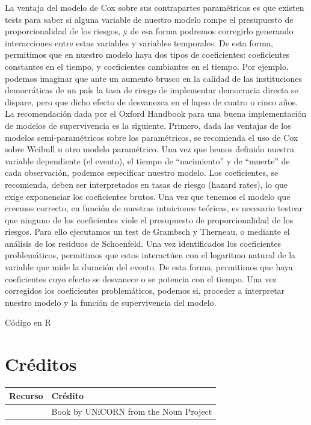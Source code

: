 \documentclass[]{book}
\begin{document}
La ventaja del modelo de Cox sobre sus contrapartes paramétricas es que
existen tests para saber si alguna variable de nuestro modelo rompe el
presupuesto de proporcionalidad de los riesgos, y de esa forma podremos
corregirlo generando interacciones entre estas variables y variables
temporales. De esta forma, permitimos que en nuestro modelo haya dos
tipos de coeficientes: coeficientes constantes en el tiempo, y
coeficientes cambiantes en el tiempo. Por ejemplo, podemos imaginar que
ante un aumento brusco en la calidad de las instituciones democráticas
de un país la tasa de riesgo de implementar democracia directa se
dispare, pero que dicho efecto de desvanezca en el lapso de cuatro o
cinco años. La recomendación dada por el Oxford Handbook para una buena
implementación de modelos de supervivencia es la siguiente. Primero,
dada las ventajas de los modelos semi-paramétricos sobre los
paramétricos, se recomienda el uso de Cox sobre Weibull u otro modelo
paramétrico. Una vez que hemos definido nuestra variable dependiente (el
evento), el tiempo de ``nacimiento'' y de ``muerte'' de cada
observación, podemos especificar nuestro modelo. Los coeficientes, se
recomienda, deben ser interpretados en tasas de riesgo (hazard rates),
lo que exige exponenciar los coeficientes brutos. Una vez que tenemos el
modelo que creemos correcto, en función de nuestras intuiciones
teóricas, es necesario testear que ninguno de los coeficientes viole el
presupuesto de proporcionalidad de los riesgos. Para ello ejecutamos un
test de Grambsch y Therneau, o mediante el análisis de los residuos de
Schoenfeld. Una vez identificados los coeficientes problemáticos,
permitimos que estos interactúen con el logaritmo natural de la variable
que mide la duración del evento. De esta forma, permitimos que haya
coeficientes cuyo efecto se desvanece o se potencia con el tiempo. Una
vez corregidos los coeficientes problemáticos, podemos si, proceder a
interpretar nuestro modelo y la función de supervivencia del modelo.

Código en R

\chapter*{Créditos}\label{creditos}

\begin{longtable}[]{@{}cl@{}}
\toprule
Recurso & Crédito\tabularnewline
\midrule
\endhead
& Book by UNiCORN from the Noun Project\tabularnewline
\bottomrule
\end{longtable}


\end{document}
